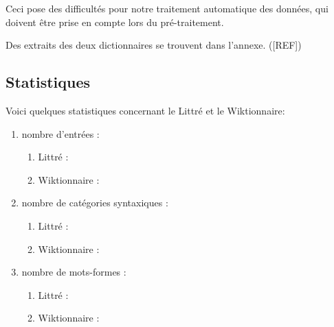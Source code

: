 Ceci pose des difficultés pour notre traitement automatique des données, qui 
doivent être prise en compte lors du pré-traitement.

Des extraits des deux dictionnaires se trouvent dans l'annexe. ([REF])

\subsection{Statistiques}

Voici quelques statistiques concernant le Littré et le Wiktionnaire:

\begin{enumerate}
 \item {nombre d'entrées :
	\begin{enumerate}
	 \item Littré :
	 \item Wiktionnaire :
	\end{enumerate}
	}
 \item {nombre de catégories syntaxiques :
	\begin{enumerate}
	 \item Littré :
	 \item Wiktionnaire :
	\end{enumerate}
	}
 \item {nombre de mots-formes :
	\begin{enumerate}
	 \item Littré :
	 \item Wiktionnaire :
	\end{enumerate}
	}
\end{enumerate}
